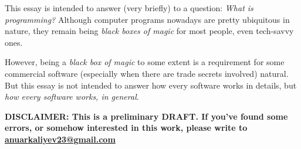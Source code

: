 \documentclass[../../programming-introduction.tex]{subfiles}
\begin{document}
    This essay is intended to answer (very briefly) to a question: \emph{What is programming?}
    Although computer programs nowadays are pretty ubiquitous in nature, they remain being \emph{black boxes of magic}
    for most people, even tech-savvy ones. \par

    However, being a \emph{black box of magic} to some extent is a requirement for some commercial software (especially when there are trade secrets involved) 
    natural. But this essay is not intended to answer how every software works in details, but \emph{how every software works, in general}. \par

    \textbf{
        DISCLAIMER: This is a preliminary DRAFT. If you've found some errors, or somehow interested in this work,
        please write to \href{mailto:anuarkaliyev23@gmail.com}{anuarkaliyev23@gmail.com}
    }
\end{document}
